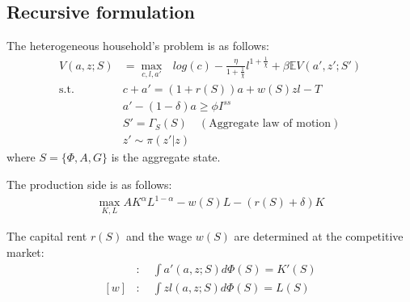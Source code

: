 \subsection*{Recursive formulation}
The heterogeneous household's problem is as follows:
\begin{align*}
  V(a,z;S) &= \max_{c,l,a'}\text{ } log(c) - \frac{\eta}{1+\frac{1}{\chi}}l^{1+\frac{1}{\chi}}+ \beta \mathbb{E}V(a',z';S')
  \\
  \text{s.t.}\quad& c + a' = (1+r(S))a + w(S)zl - T
  \\
  & a'-(1-\delta)a\geq \phi I^{ss}
  \\
  & S' = \Gamma_{S}(S) \quad(\text{Aggregate law of motion})
  \\
  & z' \sim \pi(z'|z)
\end{align*}
where $S = \{\Phi,A,G\}$ is the aggregate state.

The production side is as follows:
\begin{align*}
  \max_{K,L} A K^{\alpha}L^{1-\alpha} - w(S)L - (r(S)+\delta)K
\end{align*}

The capital rent $r(S)$ and the wage $w(S)$ are determined at the competitive market:
\begin{align*}
  [r]&:\quad \int a'(a,z;S)d\Phi(S) = K'(S)
  \\
  [w]&:\quad \int z l(a,z;S) d\Phi(S) = L(S)
\end{align*}
